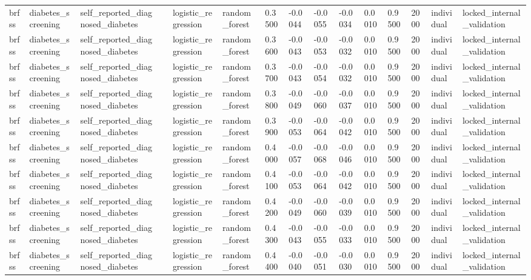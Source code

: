 \begin{tabular}{lllllllllllllll}
brfss & diabetes\_screening & self\_reported\_diagnosed\_diabetes &  & logistic\_regression & random\_forest & 0.3500 & -0.0044 & -0.0055 & -0.0034 & 0.0010 & 0.9500 & 2000 & individual & locked\_internal\_validation \\
brfss & diabetes\_screening & self\_reported\_diagnosed\_diabetes &  & logistic\_regression & random\_forest & 0.3600 & -0.0043 & -0.0053 & -0.0032 & 0.0010 & 0.9500 & 2000 & individual & locked\_internal\_validation \\
brfss & diabetes\_screening & self\_reported\_diagnosed\_diabetes &  & logistic\_regression & random\_forest & 0.3700 & -0.0043 & -0.0054 & -0.0032 & 0.0010 & 0.9500 & 2000 & individual & locked\_internal\_validation \\
brfss & diabetes\_screening & self\_reported\_diagnosed\_diabetes &  & logistic\_regression & random\_forest & 0.3800 & -0.0049 & -0.0060 & -0.0037 & 0.0010 & 0.9500 & 2000 & individual & locked\_internal\_validation \\
brfss & diabetes\_screening & self\_reported\_diagnosed\_diabetes &  & logistic\_regression & random\_forest & 0.3900 & -0.0053 & -0.0064 & -0.0042 & 0.0010 & 0.9500 & 2000 & individual & locked\_internal\_validation \\
brfss & diabetes\_screening & self\_reported\_diagnosed\_diabetes &  & logistic\_regression & random\_forest & 0.4000 & -0.0057 & -0.0068 & -0.0046 & 0.0010 & 0.9500 & 2000 & individual & locked\_internal\_validation \\
brfss & diabetes\_screening & self\_reported\_diagnosed\_diabetes &  & logistic\_regression & random\_forest & 0.4100 & -0.0053 & -0.0064 & -0.0042 & 0.0010 & 0.9500 & 2000 & individual & locked\_internal\_validation \\
brfss & diabetes\_screening & self\_reported\_diagnosed\_diabetes &  & logistic\_regression & random\_forest & 0.4200 & -0.0049 & -0.0060 & -0.0039 & 0.0010 & 0.9500 & 2000 & individual & locked\_internal\_validation \\
brfss & diabetes\_screening & self\_reported\_diagnosed\_diabetes &  & logistic\_regression & random\_forest & 0.4300 & -0.0043 & -0.0055 & -0.0033 & 0.0010 & 0.9500 & 2000 & individual & locked\_internal\_validation \\
brfss & diabetes\_screening & self\_reported\_diagnosed\_diabetes &  & logistic\_regression & random\_forest & 0.4400 & -0.0040 & -0.0051 & -0.0030 & 0.0010 & 0.9500 & 2000 & individual & locked\_internal\_validation \\

\end{tabular}
